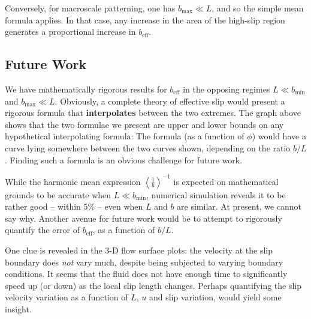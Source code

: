 \documentclass[12pt, a4paper, twoside, openright]{book}
\newcommand{\beff}{\ensuremath{b_{\mathrm{eff}}}}
\newcommand{\bmin}{\ensuremath{b_{\mathrm{min}}}}
\newcommand{\bmax}{\ensuremath{b_{\mathrm{max}}}}
\begin{document}
Conversely, for macroscale patterning, one has $\bmax \ll L$, and so the simple mean formula applies.  In that case, any increase in the area of the high-slip region generates a proportional increase in $\beff$.



\subsection*{Future Work}

We have mathematically rigorous results for $\beff$ in the opposing regimes $L \ll \bmin$ and $\bmax \ll L$.  Obviously, a complete theory of effective slip would present a rigorous formula that \textbf{interpolates} between the two extremes.  The graph above shows that the two formulae we present are upper and lower bounds on any hypothetical interpolating formula:  The formula (as a function of $\phi$) would have a curve lying somewhere between the two curves shown, depending on the ratio $b/ L$.  Finding such a formula is an obvious challenge for future work.

\vspace*{1em}

While the harmonic mean expression $\left< \frac{1}{b} \right>^{-1}$ is expected on mathematical grounds to be accurate when $L \ll \bmin$, numerical simulation reveals it to be rather good -- within 5\% -- even when $L$ and $b$ are similar.  At present, we cannot say why.  Another avenue for future work would be to attempt to rigorously quantify the error of $\beff$, as a function of $b/L$.

One clue is revealed in the 3-D flow surface plots: the velocity at the slip boundary does \emph{not} vary much, despite being subjected to varying boundary conditions.  It seems that the fluid does not have enough time to significantly speed up (or down) as the local slip length changes.  Perhaps quantifying the slip velocity variation as a function of $L$, $u$ and slip variation, would yield some insight.
\end{document}
